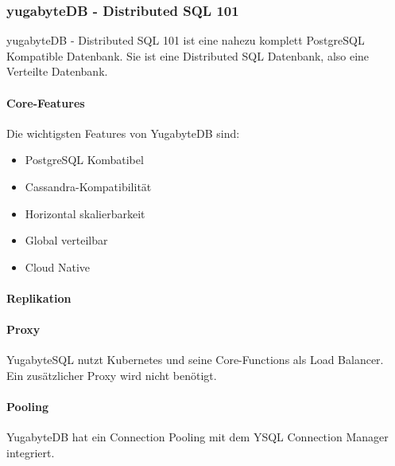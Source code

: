 
\begin{flushleft}
    \subsubsection{yugabyteDB - Distributed SQL 101}
    yugabyteDB - Distributed SQL 101 ist eine nahezu komplett \Gls{PostgreSQL} Kompatible Datenbank.
    Sie ist eine Distributed SQL Datenbank, also eine Verteilte Datenbank\cite{ZXD6D9KU}.
\end{flushleft}
\begin{flushleft}
    \paragraph{Core-Features}
    Die wichtigsten Features von YugabyteDB sind\cite{N6QKEPAC}:
    \begin{itemize}
        \item PostgreSQL Kombatibel
        \item \Gls{Cassandra}-Kompatibilität
        \item Horizontal skalierbarkeit
        \item Global verteilbar
        \item Cloud Native
    \end{itemize}
\end{flushleft}
\begin{flushleft}
    \paragraph{Replikation}
\end{flushleft}
\begin{flushleft}
    \paragraph{Proxy}
    YugabyteSQL nutzt Kubernetes und seine Core-Functions als Load Balancer.\\
    Ein zusätzlicher Proxy wird nicht benötigt.
\end{flushleft}
\begin{flushleft}
    \paragraph{Pooling}
    YugabyteDB hat ein Connection Pooling mit dem YSQL Connection Manager integriert\cite{2FQ8JXD7}.
\end{flushleft}

